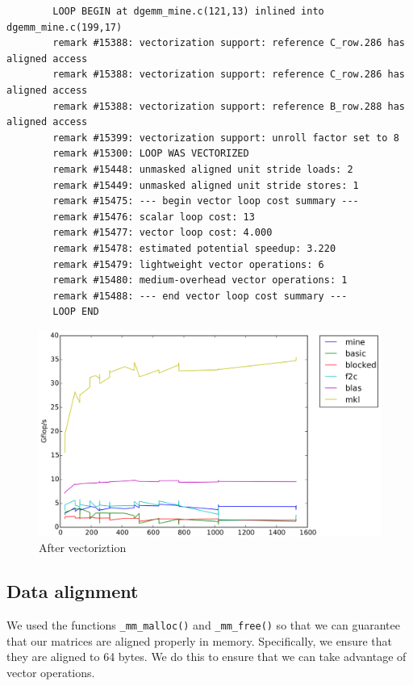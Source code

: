 \documentclass[11pt]{article}
\begin{document}
        \begin{lstlisting}
        LOOP BEGIN at dgemm_mine.c(121,13) inlined into dgemm_mine.c(199,17)
        remark #15388: vectorization support: reference C_row.286 has aligned access
        remark #15388: vectorization support: reference C_row.286 has aligned access
        remark #15388: vectorization support: reference B_row.288 has aligned access
        remark #15399: vectorization support: unroll factor set to 8
        remark #15300: LOOP WAS VECTORIZED
        remark #15448: unmasked aligned unit stride loads: 2 
        remark #15449: unmasked aligned unit stride stores: 1 
        remark #15475: --- begin vector loop cost summary ---
        remark #15476: scalar loop cost: 13 
        remark #15477: vector loop cost: 4.000 
        remark #15478: estimated potential speedup: 3.220 
        remark #15479: lightweight vector operations: 6 
        remark #15480: medium-overhead vector operations: 1 
        remark #15488: --- end vector loop cost summary ---
        LOOP END
        \end{lstlisting}
        
        \vspace{0.5cm}

        \begin{figure}[H]
            \centering
            \includegraphics[width=4.5in]{timing_vector_32_cp.png}
            \caption{After vectoriztion}
        \end{figure}
        
        \clearpage
        
    
                    
        \subsection{Data alignment}
        We used the functions \texttt{\_mm\_malloc()} and \texttt{\_mm\_free()} so that we can guarantee that our matrices are aligned properly in memory. Specifically, we ensure that they are aligned to 64 bytes. We do this to ensure that we can take advantage of vector operations.
        
\end{document}
